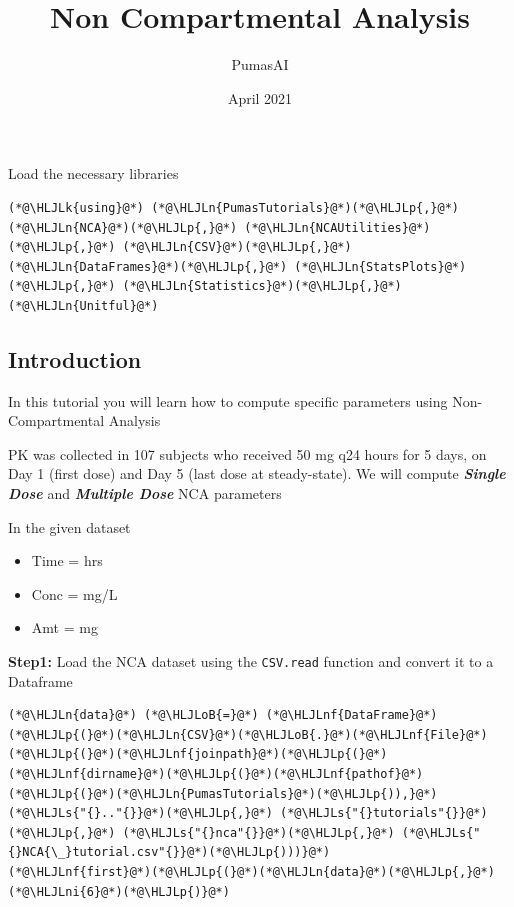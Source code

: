 \documentclass[12pt,a4paper]{article}
\title{ Non Compartmental Analysis }
\author{ PumasAI }
\date{ April 2021 }
\newcommand{\HLJLk}[1]{\textcolor[RGB]{148,91,176}{\textbf{#1}}}
\newcommand{\HLJLn}[1]{#1}
\newcommand{\HLJLnf}[1]{\textcolor[RGB]{66,102,213}{#1}}
\newcommand{\HLJLs}[1]{\textcolor[RGB]{201,61,57}{#1}}
\newcommand{\HLJLni}[1]{\textcolor[RGB]{59,151,46}{#1}}
\newcommand{\HLJLoB}[1]{\textcolor[RGB]{102,102,102}{\textbf{#1}}}
\newcommand{\HLJLp}[1]{#1}
\begin{document}
\maketitle

Load the necessary libraries


\begin{lstlisting}
(*@\HLJLk{using}@*) (*@\HLJLn{PumasTutorials}@*)(*@\HLJLp{,}@*) (*@\HLJLn{NCA}@*)(*@\HLJLp{,}@*) (*@\HLJLn{NCAUtilities}@*)(*@\HLJLp{,}@*) (*@\HLJLn{CSV}@*)(*@\HLJLp{,}@*) (*@\HLJLn{DataFrames}@*)(*@\HLJLp{,}@*) (*@\HLJLn{StatsPlots}@*)(*@\HLJLp{,}@*) (*@\HLJLn{Statistics}@*)(*@\HLJLp{,}@*) (*@\HLJLn{Unitful}@*)
\end{lstlisting}


\subsection{Introduction}
In this tutorial you will learn how to compute specific parameters using Non-Compartmental Analysis

PK was collected in 107 subjects who received 50 mg q24 hours for 5 days, on Day 1 (first dose) and Day 5 (last dose at steady-state). We will compute \emph{\textbf{Single Dose}} and \emph{\textbf{Multiple Dose}} NCA parameters

In the given dataset

\begin{itemize}
\item Time  = hrs


\item Conc  = mg/L


\item Amt   = mg

\end{itemize}
\textbf{Step1:} Load the NCA dataset using the \texttt{CSV.read} function and convert it to a Dataframe


\begin{lstlisting}
(*@\HLJLn{data}@*) (*@\HLJLoB{=}@*) (*@\HLJLnf{DataFrame}@*)(*@\HLJLp{(}@*)(*@\HLJLn{CSV}@*)(*@\HLJLoB{.}@*)(*@\HLJLnf{File}@*)(*@\HLJLp{(}@*)(*@\HLJLnf{joinpath}@*)(*@\HLJLp{(}@*)(*@\HLJLnf{dirname}@*)(*@\HLJLp{(}@*)(*@\HLJLnf{pathof}@*)(*@\HLJLp{(}@*)(*@\HLJLn{PumasTutorials}@*)(*@\HLJLp{)),}@*) (*@\HLJLs{"{}.."{}}@*)(*@\HLJLp{,}@*) (*@\HLJLs{"{}tutorials"{}}@*)(*@\HLJLp{,}@*) (*@\HLJLs{"{}nca"{}}@*)(*@\HLJLp{,}@*) (*@\HLJLs{"{}NCA{\_}tutorial.csv"{}}@*)(*@\HLJLp{)))}@*)
(*@\HLJLnf{first}@*)(*@\HLJLp{(}@*)(*@\HLJLn{data}@*)(*@\HLJLp{,}@*) (*@\HLJLni{6}@*)(*@\HLJLp{)}@*)
\end{lstlisting}
\end{document}
